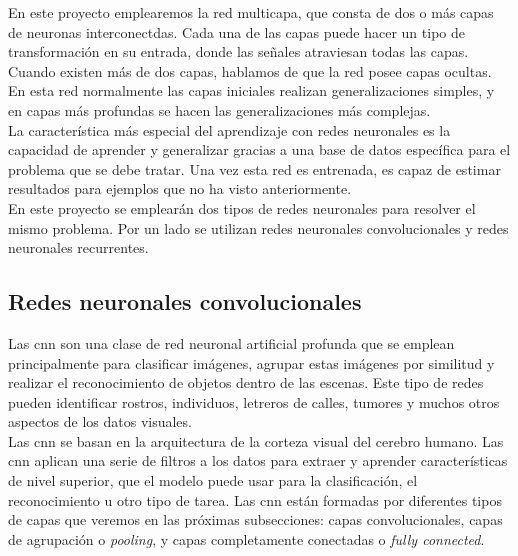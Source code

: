 En este proyecto emplearemos la red multicapa, que consta de dos o más capas de neuronas interconectdas. Cada una de las capas puede hacer un tipo de transformación en su entrada, donde las señales atraviesan todas las capas. Cuando existen más de dos capas, hablamos de que la red posee capas ocultas. En esta red normalmente las capas iniciales realizan generalizaciones simples, y en capas más profundas se hacen las generalizaciones más complejas.\\

La característica más especial del aprendizaje con redes neuronales es la capacidad de aprender y generalizar gracias a una base de datos específica para el problema que se debe tratar. Una vez esta red es entrenada, es capaz de estimar resultados para ejemplos que no ha visto anteriormente.\\

En este proyecto se emplearán dos tipos de redes neuronales para resolver el mismo problema. Por un lado se utilizan redes neuronales convolucionales y redes neuronales recurrentes.


\subsection{Redes neuronales convolucionales}

Las \acrfull{cnn} son una clase de red neuronal artificial profunda que se emplean principalmente para clasificar imágenes, agrupar estas imágenes por similitud y realizar el reconocimiento de objetos dentro de las escenas. Este tipo de redes pueden identificar rostros, individuos, letreros de calles, tumores y muchos otros aspectos de los datos visuales.\\

Las \acrshort{cnn} se basan en la arquitectura de la corteza visual del cerebro humano. Las \acrshort{cnn} aplican una serie de filtros a los datos para extraer y aprender características de nivel superior, que el modelo puede usar para la clasificación, el reconocimiento u otro tipo de tarea. Las \acrshort{cnn} están formadas por diferentes tipos de capas que veremos en las próximas subsecciones: capas convolucionales, capas de agrupación o \textit{pooling}, y capas completamente conectadas o \textit{fully connected}. \\


